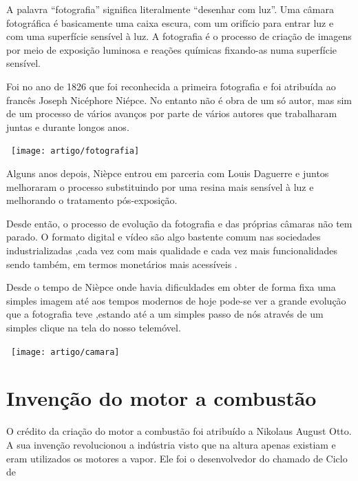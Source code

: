 \documentclass{report}
\begin{document}
A palavra “fotografia” significa literalmente “desenhar com luz”.
Uma câmara fotográfica é basicamente uma caixa escura, com um orifício para entrar luz e com uma superfície sensível à luz.
A fotografia é o processo de criação de imagens por meio de exposição luminosa e reações químicas fixando-as numa superfície sensível.

Foi no ano de 1826 que foi reconhecida a primeira fotografia e foi atribuída ao francês Joseph Nicéphore Niépce. No entanto não é obra de um só autor, mas sim de um processo de vários avanços por parte de vários autores que trabalharam juntas e durante longos anos.
\begin{center}
\ \texttt{[image: artigo/fotografia]}
\end{center}
 \begin{figure}[h]
 	\centerline{}
 \end{figure}

\pagebreak

Alguns anos depois, Nièpce entrou em parceria com Louis Daguerre e juntos melhoraram o processo substituindo por uma resina mais sensível à luz e melhorando o tratamento pós-exposição. 

Desde então, o processo de evolução da fotografia e das próprias câmaras não tem parado. O formato digital e vídeo são algo bastente comum nas sociedades industrializadas ,cada vez com mais qualidade e cada vez mais funcionalidades sendo também, em termos monetários mais acessíveis .

Desde o tempo de Nièpce onde havia dificuldades em obter de forma fixa uma simples imagem até aos tempos modernos de hoje pode-se ver a grande evolução que a fotografia teve ,estando até a um simples passo de nós através de um simples clique na tela do nosso telemóvel.

\begin{center}
\ \texttt{[image: artigo/camara]}
\end{center}
 \begin{figure}[h]
 	\centerline{}
 \end{figure}


\chapter{Invenção do motor a combustão}
O crédito da criação do motor a combustão foi atribuído a Nikolaus August Otto. A sua invenção revolucionou a indústria visto que na altura apenas existiam e eram utilizados os motores a vapor. Ele foi o desenvolvedor do chamado de Ciclo de 
\end{document}
